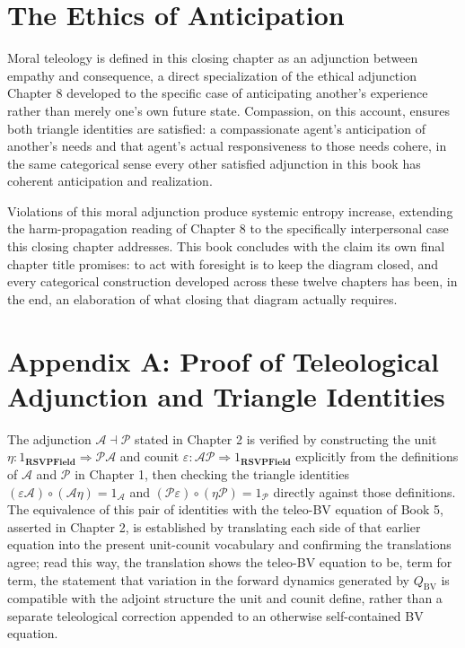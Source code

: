 \chapter{The Ethics of Anticipation}

Moral teleology is defined in this closing chapter as an adjunction between empathy and consequence, a direct specialization of the ethical adjunction Chapter 8 developed to the specific case of anticipating another's experience rather than merely one's own future state. Compassion, on this account, ensures both triangle identities are satisfied: a compassionate agent's anticipation of another's needs and that agent's actual responsiveness to those needs cohere, in the same categorical sense every other satisfied adjunction in this book has coherent anticipation and realization.

Violations of this moral adjunction produce systemic entropy increase, extending the harm-propagation reading of Chapter 8 to the specifically interpersonal case this closing chapter addresses. This book concludes with the claim its own final chapter title promises: to act with foresight is to keep the diagram closed, and every categorical construction developed across these twelve chapters has been, in the end, an elaboration of what closing that diagram actually requires.

\chapter*{Appendix A: Proof of Teleological Adjunction and Triangle Identities}

The adjunction $\mathcal{A} \dashv \mathcal{P}$ stated in Chapter 2 is verified by constructing the unit $\eta: 1_{\mathbf{RSVPField}} \Rightarrow \mathcal{P}\mathcal{A}$ and counit $\varepsilon: \mathcal{A}\mathcal{P} \Rightarrow 1_{\mathbf{RSVPField}}$ explicitly from the definitions of $\mathcal{A}$ and $\mathcal{P}$ in Chapter 1, then checking the triangle identities $(\varepsilon\mathcal{A}) \circ (\mathcal{A}\eta) = 1_{\mathcal{A}}$ and $(\mathcal{P}\varepsilon) \circ (\eta\mathcal{P}) = 1_{\mathcal{P}}$ directly against those definitions. The equivalence of this pair of identities with the teleo-BV equation of Book 5, asserted in Chapter 2, is established by translating each side of that earlier equation into the present unit-counit vocabulary and confirming the translations agree; read this way, the translation shows the teleo-BV equation to be, term for term, the statement that variation in the forward dynamics generated by $Q_{\text{BV}}$ is compatible with the adjoint structure the unit and counit define, rather than a separate teleological correction appended to an otherwise self-contained BV equation.

